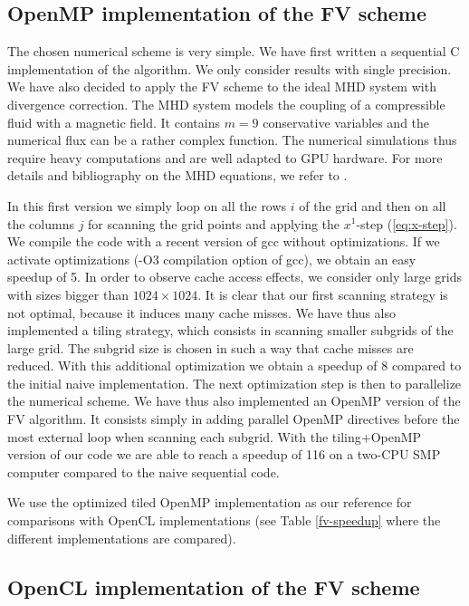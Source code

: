 \documentclass[12pt]{amsart}
\begin{document}
\subsection{OpenMP implementation of the FV scheme}
The chosen numerical scheme is very simple. We have first written a sequential C implementation of the algorithm. We only consider results with single precision. We have also decided to apply the FV scheme to the ideal MHD system with divergence correction. The MHD system models the coupling of a compressible fluid with a magnetic field. It contains $m=9$ conservative variables and the numerical flux can be a rather complex function. The numerical simulations thus require heavy computations and are well adapted to GPU hardware. For more details and bibliography on the MHD equations, we refer to \cite{massaro2014numerical}.

In this first version we simply loop on all the rows $i$ of the grid and then on all the columns $j$ for scanning the grid points and applying the $x^1$-step (\ref{eq:x-step}).
We compile the code with a recent version of gcc without optimizations.
If we activate optimizations (-O3 compilation option of gcc), we obtain an easy speedup of 5. In order to observe cache access effects, we consider only large grids with sizes bigger than $1024\times 1024$.
It is clear that our first scanning strategy is not optimal, because it induces many cache misses. We have thus also implemented a tiling strategy, which consists in scanning smaller subgrids of the large grid. The subgrid size is chosen in such a way that cache misses are reduced. With this additional optimization we obtain a speedup of 8 compared to the initial naive implementation.
The next optimization step is then to parallelize the numerical scheme. We have thus also implemented an OpenMP version of the FV algorithm. It consists simply in adding parallel OpenMP directives before the most external loop when scanning each subgrid. With the tiling+OpenMP version of our code we are able to reach a speedup of 116 
 on a two-CPU SMP computer compared to the naive sequential code.

We use the optimized tiled OpenMP implementation as our reference for comparisons with OpenCL implementations (see Table \ref{fv-speedup} where the different implementations are compared).

\subsection{OpenCL implementation of the FV scheme}
\end{document}

